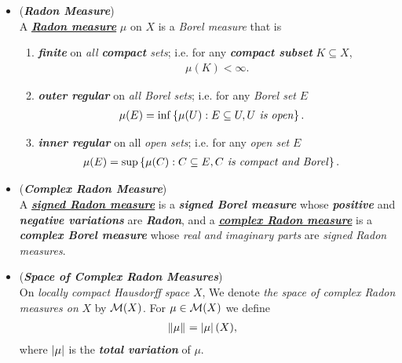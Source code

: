 \documentclass[11pt]{article}
\begin{document}
\begin{itemize}
\item \begin{definition} (\emph{\textbf{Radon Measure}}) \citep{folland2013real} \\
A \underline{\textbf{\emph{Radon measure}}} $\mu$ on $X$ is a \emph{Borel measure} that is 
\begin{enumerate}
\item \emph{\textbf{finite}} on \emph{all \textbf{compact} sets}; i.e. for any \emph{\textbf{compact subset}} $K \subseteq X$, 
\begin{align*}
\mu(K) < \infty.
\end{align*}
\item \emph{\textbf{outer regular}} on \emph{all Borel sets}; i.e. for any \emph{Borel set} $E$ 
\begin{align*}
\mu(E) &= \inf\left\{\mu(U): E \subseteq U, U \text{\emph{ is open}}\right\}.
\end{align*}
\item  \emph{\textbf{inner regular}} on all \emph{open sets}; i.e. for any \emph{open set} $E$
\begin{align*}
\mu(E) &= \sup\left\{\mu(C): C \subseteq E, C \text{\emph{ is compact and Borel}}\right\}.
\end{align*}
\end{enumerate}
\end{definition}

\item \begin{definition} (\emph{\textbf{Complex Radon Measure}})\\
A \underline{\emph{\textbf{signed Radon measure}}} is a \emph{\textbf{signed Borel measure}} whose \emph{\textbf{positive}} and \emph{\textbf{negative variations}} are \emph{\textbf{Radon}}, and a \underline{\emph{\textbf{complex Radon measure}}} is a \emph{\textbf{complex Borel measure}} whose \emph{real and imaginary parts} are \textit{signed Radon measures}. 
\end{definition}

\item \begin{definition} (\emph{\textbf{Space of Complex Radon Measures}})\\
On \emph{locally compact Hausdorff space} $X$, We denote \emph{the space of complex Radon measures
on} $X$ by ${\mathcal M}(X)$. For $\mu \in {\mathcal M}(X)$ we define
\begin{align*}
\left\|\mu\right\|_{} &= \left\lvert \mu \right\rvert(X),
\end{align*}
where $ \left\lvert \mu \right\rvert$ is the \emph{\textbf{total variation}} of $\mu$.  
\end{definition}



\end{itemize}
\end{document}

